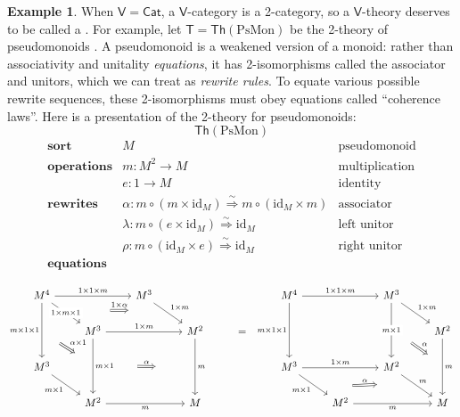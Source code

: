 \documentclass{amsart}
\newcommand{\define}[1]{{\bf \boldmath{#1}}}
\theoremstyle{definition}
\newtheorem{example}[theorem]{Example}
\newcommand{\Th}{\mathsf{Th}}
\newcommand{\Cat}{\mathsf{Cat}}
\newcommand{\V}{\mathsf{V}}
\newcommand{\T}{\mathsf{T}}
\newcommand{\maps}{\colon}
\newcommand{\id}{\mathrm{id}}
\begin{document}
\begin{example}
\label{ex:1}
When $\V = \Cat$, a $\V$-category is a 2-category, so a $\V$-theory deserves to be called a \define{2-theory}.  For example, let $\T = \Th(\mathrm{PsMon})$ be the 2-theory of pseudomonoids \cite{pseudo}.   A pseudomonoid is a weakened version of a monoid: rather than associativity and unitality \textit{equations}, it has 2-isomorphisms called the associator and unitors, which we can treat as \textit{rewrite rules}.  To equate various possible rewrite sequences, these 2-isomorphisms must obey equations called ``coherence laws''.  Here is a presentation of the 2-theory for pseudomonoids:\newpage
	\[ \Th(\mathrm{PsMon}) \]
	\[\begin{array}{lll}
	\textbf{sort} & M & \text{pseudomonoid}\\
	 \textbf{operations}
	& m\maps M^2 \to M & \text{multiplication}\\
	 & e\maps1 \to M & \text{identity}\\
	\textbf{rewrites} & \alpha \colon m \circ (m \times \id_M) \stackrel{\sim}{\Longrightarrow} m \circ (\id_M \times m) & \text{associator}\\
	& \lambda\maps  m \circ (e \times \id_M) \stackrel{\sim}{\Longrightarrow} \id_M & \text{left unitor}\\
	& \rho\maps m \circ (\id_M \times e) \stackrel{\sim}{\Longrightarrow} \id_M & \text{right unitor}\\
	\textbf{equations}
          \end{array}\]

        \[\begin{tikzcd}
          M^4 \ar[rr,"1\times 1\times m"] \ar[dr,"1\times m\times 1" description, ""name=a1] \ar[dd, "m\times 1\times 1",swap,""name=b1] && M^3 \ar[dr, "1\times m",""name=a2] \arrow[Rightarrow,"1\times \alpha",from=a1,to=a2,shorten >=1.3cm,shorten <=1.3cm] &&& M^4 \ar[rr, "1\times 1\times m"] \ar[dd,"m\times 1\times 1",swap,""name=d1] && M^3 \ar[dd,"m\times 1" description,""name=d2] \ar[dr,"1\times m"] %
          & \\
          & M^3 \ar[rr,"1\times m"] \ar[dd,"m\times 1",""name=b2] \arrow[Rightarrow,"\alpha\times 1",from=b1,to=b2,shorten >=0.7cm,shorten <=0.7cm] && M^2 \ar[dd,"m",""name=c1] & = & &&& M^2 \ar[dd,"m",""name=f1] \arrow[Rightarrow,"\alpha",from=d2,to=f1,shorten >=0.6cm,shorten <=0.6cm] \arrow[Rightarrow,"\alpha",from=b2,to=c1,shorten >=1.3cm,shorten <=1.3cm] \\
          M^3 \ar[dr,"m\times 1",swap] &&& && M^3 \ar[rr,"1\times m"] \ar[dr,"m\times 1",swap,,""name=e1] && M^2 \ar[dr,"m",,""name=e2] \arrow[Rightarrow,"\alpha",from=e1,to=e2,shorten >=1.3cm,shorten <=1.3cm] & \\
          & M^2 \ar[rr,"m",swap] && M && & M^2 \ar[rr,"m",swap] && M
        \end{tikzcd}\]


\end{example}
\end{document}
